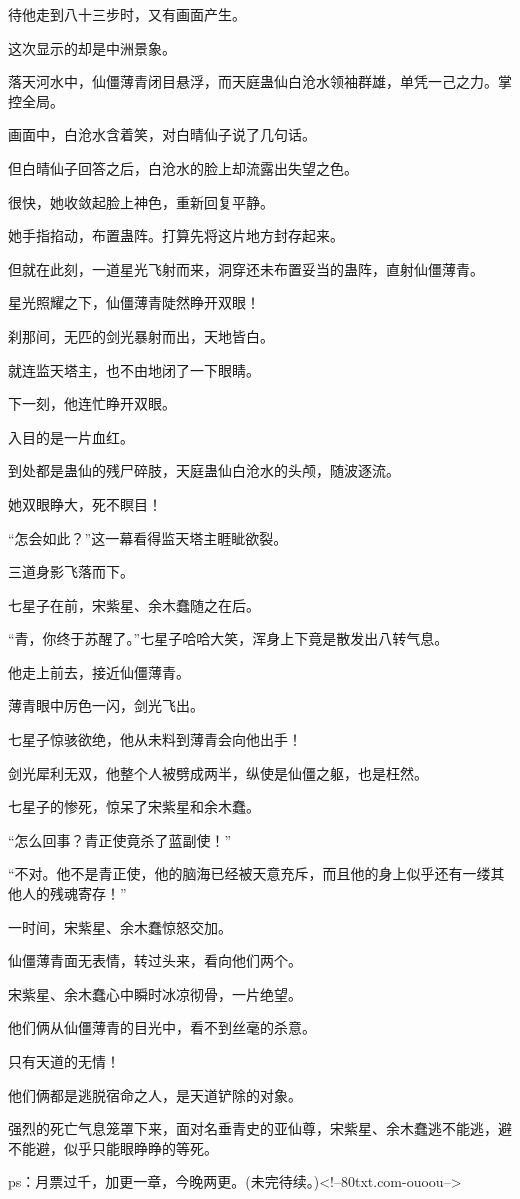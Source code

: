 \begin{this_body}
待他走到八十三步时，又有画面产生。

这次显示的却是中洲景象。

落天河水中，仙僵薄青闭目悬浮，而天庭蛊仙白沧水领袖群雄，单凭一己之力。掌控全局。

画面中，白沧水含着笑，对白晴仙子说了几句话。

但白晴仙子回答之后，白沧水的脸上却流露出失望之色。

很快，她收敛起脸上神色，重新回复平静。

她手指掐动，布置蛊阵。打算先将这片地方封存起来。

但就在此刻，一道星光飞射而来，洞穿还未布置妥当的蛊阵，直射仙僵薄青。

星光照耀之下，仙僵薄青陡然睁开双眼！

刹那间，无匹的剑光暴射而出，天地皆白。

就连监天塔主，也不由地闭了一下眼睛。

下一刻，他连忙睁开双眼。

入目的是一片血红。

到处都是蛊仙的残尸碎肢，天庭蛊仙白沧水的头颅，随波逐流。

她双眼睁大，死不瞑目！

“怎会如此？”这一幕看得监天塔主睚眦欲裂。

三道身影飞落而下。

七星子在前，宋紫星、余木蠢随之在后。

“青，你终于苏醒了。”七星子哈哈大笑，浑身上下竟是散发出八转气息。

他走上前去，接近仙僵薄青。

薄青眼中厉色一闪，剑光飞出。

七星子惊骇欲绝，他从未料到薄青会向他出手！

剑光犀利无双，他整个人被劈成两半，纵使是仙僵之躯，也是枉然。

七星子的惨死，惊呆了宋紫星和余木蠢。

“怎么回事？青正使竟杀了蓝副使！”

“不对。他不是青正使，他的脑海已经被天意充斥，而且他的身上似乎还有一缕其他人的残魂寄存！”

一时间，宋紫星、余木蠢惊怒交加。

仙僵薄青面无表情，转过头来，看向他们两个。

宋紫星、余木蠢心中瞬时冰凉彻骨，一片绝望。

他们俩从仙僵薄青的目光中，看不到丝毫的杀意。

只有天道的无情！

他们俩都是逃脱宿命之人，是天道铲除的对象。

强烈的死亡气息笼罩下来，面对名垂青史的亚仙尊，宋紫星、余木蠢逃不能逃，避不能避，似乎只能眼睁睁的等死。

ps：月票过千，加更一章，今晚两更。(未完待续。)<!--80txt.com-ouoou-->

\end{this_body}

